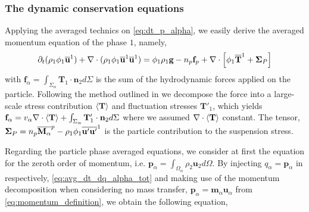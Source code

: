 \subsubsection{The dynamic conservation equations}

Applying the averaged technics on \ref{eq:dt_p_alpha}, we easily derive the averaged momentum  equation of the phase $1$, namely,
\begin{equation}
    \partial_t (\rho_1\phi_1\overline{\textbf{u}}^1)
    +  \mathbf{\nabla} \cdot (\rho_1\phi_1\overline{\textbf{u}}^1 \overline{\textbf{u}}^1)
    = 
     \phi_1 \rho_1 \textbf{g}
    - n_p\textbf{f}_p
    +  \mathbf{\nabla} \cdot \left[
        \phi_1\overline{ \textbf{T}}^1
        + \mathbf{\Sigma}_P
    \right]
    \label{eq:hybrid_avg_dt_rhou}
\end{equation}
with $\textbf{f}_\alpha = \int_{\Sigma_\alpha} \mathbf{T}_1 \cdot \textbf{n}_2d\Sigma$ is the sum of the hydrodynamic forces applied on the particle. 
Following the method outlined in \citet{chu2016flux} we decompose the force into a large-scale stress contribution $\left<\textbf{T}\right>$ and fluctuation stresses $\textbf{T}'_1$, which yields $\textbf{f}_\alpha = v_\alpha \mathbf{\nabla} \cdot\left<\textbf{T}\right>+ \int_{\Sigma_\alpha} \mathbf{T}'_1 \cdot \textbf{n}_2d\Sigma$ where we assumed $\mathbf{\nabla}\cdot\left<\textbf{T}\right>$ constant. 
The tensor, $\mathbf{\Sigma}_P = n_p\overline{\textbf{M}_\alpha}^{p} -  \rho_1\phi_1\overline{\textbf{u}'\textbf{u}'}^1$ is the particle contribution to the suspension stress.

Regarding the particle phase averaged equations, we consider at first the equation for the zeroth order of momentum, i.e. $\textbf{p}_\alpha = \int_{\Omega_\alpha} \rho_2 \textbf{u}_2 d\Omega$. 
By injecting $q_\alpha = \textbf{p}_\alpha$ in respectively, \ref{eq:avg_dt_dq_alpha_tot} and making use of the momentum decomposition when considering no mass transfer, $\textbf{p}_\alpha = \textbf{m}_\alpha \textbf{u}_\alpha$ from \ref{eq:momentum_definition},  
we obtain the following equation,

